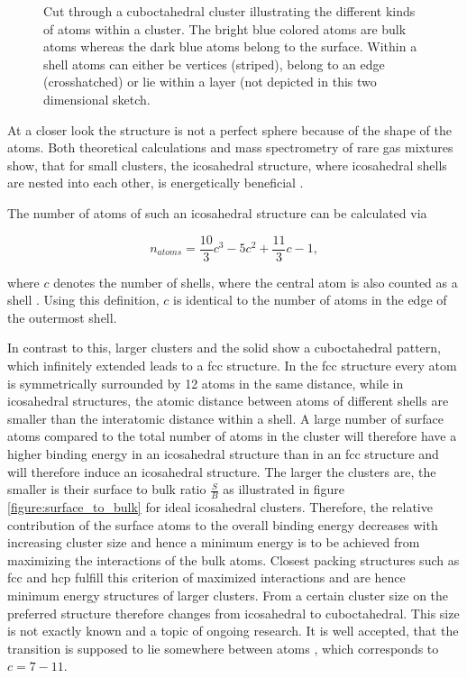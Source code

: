 \begin{figure}[h]
 \centering
 
 \caption{Cut through a cuboctahedral cluster illustrating the different
          kinds of atoms within a cluster. The bright blue colored atoms
          are bulk atoms whereas the dark blue atoms belong to the surface.
          Within a shell atoms can either be vertices (striped), belong to
          an edge (crosshatched) or lie within a layer (not depicted in this
          two dimensional sketch.}
 \label{figure:cluster_cut}
\end{figure}


At a closer look the structure is not a perfect sphere
because of the shape of the atoms.
Both theoretical
calculations and mass spectrometry of rare gas mixtures show, that
for small clusters, the icosahedral structure, where icosahedral
shells are nested into each other, is energetically beneficial
\cite{Echt81,Mackay62,Bjorneholm09,Martin96}.

The number of atoms of such an icosahedral structure can be calculated via

\begin{equation}
  n_{atoms} = \frac{10}{3} c^3 - 5 c^2 + \frac{11}{3} c -1 ,
\end{equation}

where $c$ denotes the number of shells, where the central atom is
also counted as a shell \cite{Martin96}. Using this definition, $c$ is
identical to the number of atoms
in the edge of the outermost shell.


In contrast to this, larger clusters and the solid show a cuboctahedral
pattern, which infinitely extended leads to a \ac{fcc} structure.
In the \ac{fcc} structure every atom is symmetrically surrounded
by 12 atoms in the same distance, while in icosahedral structures, the
atomic distance between atoms of different shells are smaller than the
interatomic distance within a shell. A large number of surface atoms
compared to the total number of atoms in the cluster will therefore have a
higher binding energy in an icosahedral structure than in an \ac{fcc} structure
and will therefore induce an icosahedral structure.
The larger the clusters are, the smaller is their surface to bulk
ratio $\frac{S}{B}$ as illustrated in                 
figure \ref{figure:surface_to_bulk} for ideal icosahedral clusters.
Therefore, the relative contribution
of the surface atoms to the overall binding energy decreases with increasing
cluster size and hence a minimum energy is to be achieved from maximizing
the interactions of the bulk atoms. Closest packing structures such as
\ac{fcc} and \ac{hcp} fulfill this criterion of maximized interactions and
are hence minimum energy structures of larger clusters. From a certain cluster size on the
preferred structure therefore changes from icosahedral to cuboctahedral. This size
is not exactly known and a topic of ongoing research. It is well accepted,
that the transition is supposed to lie somewhere between \unit[800--3000]{atoms}
\cite{Hartke02,Pahl08}, which corresponds to $c = 7 - 11$.

